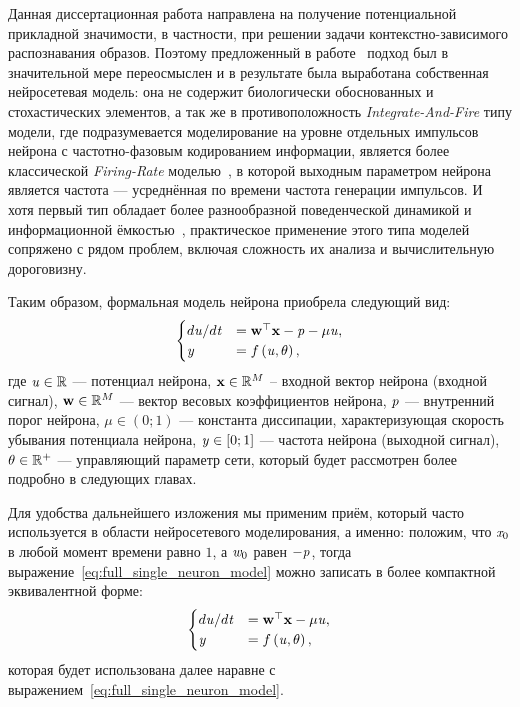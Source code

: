 Данная диссертационная работа направлена на получение потенциальной прикладной значимости, в частности, при решении задачи контекстно-зависимого распознавания образов. Поэтому предложенный в работе~\cite{EmelyanovYaroslavsky1990} подход был в значительной мере переосмыслен и в результате была выработана собственная нейросетевая модель: она не содержит биологически обоснованных и стохастических элементов, а так же в противоположность \textit{Integrate-And-Fire} типу модели, где подразумевается моделирование на уровне отдельных импульсов нейрона с частотно-фазовым кодированием информации, является более классической \textit{Firing-Rate}  моделью~\cite{Dayan2001}, в которой выходным параметром нейрона является \socalled частота --- усреднённая по времени частота генерации импульсов. И хотя первый тип обладает более разнообразной поведенческой динамикой и информационной ёмкостью~\cite{Izhikevich2006}, практическое применение этого типа моделей сопряжено с рядом проблем, включая сложность их анализа и вычислительную дороговизну.

Таким образом, формальная модель нейрона приобрела следующий вид:
\begin{equation}
	\label{eq:full_single_neuron_model}
    \begin{cases}
	    d\mathit{u}/d\mathit{t} &= \mathrm{\mathbf{w}}^{\top} \mathrm{\mathbf{x}} - \mathit{p} - \mu \mathit{u}, \\
        \mathit{y}              &= f\left( \mathit{u}, \theta \right), \\
    \end{cases}
\end{equation}
где $\mathit{u} \in \mathbb{R}$ --- потенциал нейрона, $\mathrm{\mathbf{x}} \in \mathbb{R}^{M}$ -- входной вектор нейрона (входной сигнал), $\mathrm{\mathbf{w}} \in \mathbb{R}^{M}$ --- вектор весовых коэффициентов нейрона,  $\mathit{p}$ --- внутренний порог нейрона, $\mu \in \left(0;1\right)$ --- константа диссипации, характеризующая скорость убывания потенциала нейрона, $\mathit{y} \in \left[0;1\right]$ --- частота нейрона (выходной сигнал), $\theta \in \mathbb{R}^{+}$ --- управляющий параметр сети, который будет рассмотрен более подробно в следующих главах. 

Для удобства дальнейшего изложения мы применим приём, который часто используется в области нейросетевого моделирования, а именно: положим, что $\vectoritem{x}{0}$ в любой момент времени равно $1$, а $\vectoritem{w}{0}$ равен $-\mathit{p}$, тогда выражение~\eqref{eq:full_single_neuron_model} можно записать в более компактной эквивалентной форме:
\begin{equation}
    \label{eq:single_neuron_model}
    \begin{cases}
    d\mathit{u}/d\mathit{t} &= \mathrm{\mathbf{w}}^{\top} \mathrm{\mathbf{x}} - \mu \mathit{u}, \\
    \mathit{y}              &= f\left( \mathit{u}, \theta \right), \\
    \end{cases}
\end{equation}
которая будет использована далее наравне с выражением~\eqref{eq:full_single_neuron_model}.

